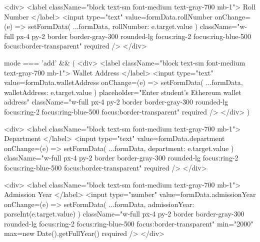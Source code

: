{{              <div>
                <label className="block text-sm font-medium text-gray-700 mb-1">
                  Roll Number
                </label>
                <input
                  type="text"
                  value={formData.rollNumber}
                  onChange={(e) => setFormData({ ...formData, rollNumber: e.target.value })}
                  className="w-full px-4 py-2 border border-gray-300 rounded-lg focus:ring-2 focus:ring-blue-500 focus:border-transparent"
                  required
                />
              </div>

              {mode === 'add' && (
                <div>
                  <label className="block text-sm font-medium text-gray-700 mb-1">
                    Wallet Address
                  </label>
                  <input
                    type="text"
                    value={formData.walletAddress}
                    onChange={(e) => setFormData({ ...formData, walletAddress: e.target.value })}
                    placeholder="Enter student's Ethereum wallet address"
                    className="w-full px-4 py-2 border border-gray-300 rounded-lg focus:ring-2 focus:ring-blue-500 focus:border-transparent"
                    required
                  />
                </div>
              )}

              <div>
                <label className="block text-sm font-medium text-gray-700 mb-1">
                  Department
                </label>
                <input
                  type="text"
                  value={formData.department}
                  onChange={(e) => setFormData({ ...formData, department: e.target.value })}
                  className="w-full px-4 py-2 border border-gray-300 rounded-lg focus:ring-2 focus:ring-blue-500 focus:border-transparent"
                  required
                />
              </div>

              <div>
                <label className="block text-sm font-medium text-gray-700 mb-1">
                  Admission Year
                </label>
                <input
                  type="number"
                  value={formData.admissionYear}
                  onChange={(e) => setFormData({ ...formData, admissionYear: parseInt(e.target.value) })}
                  className="w-full px-4 py-2 border border-gray-300 rounded-lg focus:ring-2 focus:ring-blue-500 focus:border-transparent"
                  min="2000"
                  max={new Date().getFullYear()}
                  required
                />
              </div>

}}
